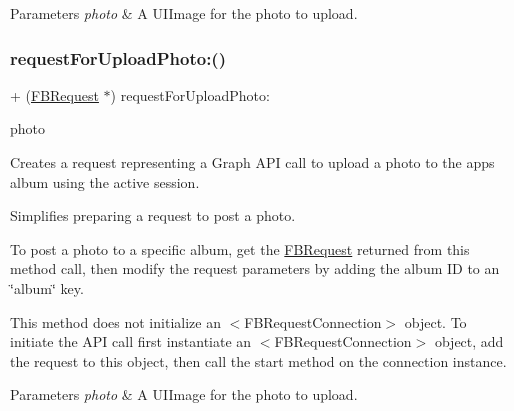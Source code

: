 \begin{DoxyParams}{Parameters}
{\em photo} & A {\ttfamily U\+I\+Image} for the photo to upload. \\
\hline
\end{DoxyParams}
\mbox{\label{interfaceFBRequest_a871fdb57a3c9907a5d2b788ca442c586}} 
\subsubsection{\texorpdfstring{request\+For\+Upload\+Photo\+:()}{requestForUploadPhoto:()}\hspace{0.1cm}{\footnotesize\ttfamily [3/5]}}
{\footnotesize\ttfamily + (\hyperlink{interfaceFBRequest}{F\+B\+Request} $\ast$) request\+For\+Upload\+Photo\+: \begin{DoxyParamCaption}\item[{(U\+I\+Image $\ast$)}]{photo }\end{DoxyParamCaption}}

Creates a request representing a Graph A\+PI call to upload a photo to the app\textquotesingle{}s album using the active session.

Simplifies preparing a request to post a photo.

To post a photo to a specific album, get the {\ttfamily \hyperlink{interfaceFBRequest}{F\+B\+Request}} returned from this method call, then modify the request parameters by adding the album ID to an \char`\"{}album\char`\"{} key.

This method does not initialize an $<$\+F\+B\+Request\+Connection$>$ object. To initiate the A\+PI call first instantiate an $<$\+F\+B\+Request\+Connection$>$ object, add the request to this object, then call the {\ttfamily start} method on the connection instance.


\begin{DoxyParams}{Parameters}
{\em photo} & A {\ttfamily U\+I\+Image} for the photo to upload. \\
\hline
\end{DoxyParams}
\mbox{\label{interfaceFBRequest_a871fdb57a3c9907a5d2b788ca442c586}} 
